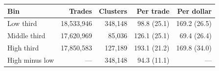 \begin{tabular}{lrrrr}
\toprule
Bin & Trades & Clusters & Per trade & Per dollar \\
\midrule
Low third & 18,533,946 & 348,148 & 98.8 (25.1) & 169.2 (26.5) \\
Middle third & 17,620,969 & 85,036 & 126.1 (25.1) & 69.4 (26.4) \\
High third & 17,850,583 & 127,189 & 193.1 (21.2) & 169.8 (34.0) \\
High minus low & --- & 348,148 & 94.3 (11.1) & --- \\
\bottomrule
\end{tabular}
